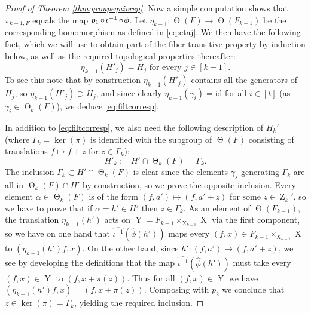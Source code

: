 \documentclass[a4paper,12pt,reqno]{amsart}
\theoremstyle{definition}
\def\to{\rightarrow}
\newcommand{\id}{\mathrm{id}}
\DeclareMathOperator{\ab}{Z}
\DeclareMathOperator{\tran}{\Theta}
\DeclareMathOperator{\ns}{X}
\DeclareMathOperator{\nss}{Y}
\DeclareMathOperator{\co}{\circ\hspace{-0.02 cm}}
\begin{document}
\begin{proof}[Proof of Theorem \ref{thm:groupequivrep}]
Now a simple computation shows that $\pi_{k-1,F}$ equals the map $p_1\co \iota^{-1}\co \phi$. Let $\eta_{k-1}:\tran(F)\to \tran(F_{k-1})$ be the corresponding homomorphism as defined in \eqref{eq:etaj}. We then have the following fact, which we will use to obtain part of the fiber-transitive property by induction below, as well as the required topological properties thereafter:
\begin{equation}\label{eq:filtcorresp}
\textrm{$\eta_{k-1}(H'_j)=H_j$ for every $j\in [k-1]$.}
\end{equation}
 To see this note that by construction $\eta_{k-1}(H'_j)$ contains all the generators of $H_j$, so $\eta_{k-1}(H'_j)\supset H_j$, and since clearly $\eta_{k-1}(\gamma_i)=\id$ for all $i\in[t]$ (as $\gamma_i\in\tran_k(F)$), we deduce \eqref{eq:filtcorresp}. 

In addition to \eqref{eq:filtcorresp}, we also need the following description of $H_k'$ (where 
$\Gamma_k=\ker(\pi)$ is identified with the subgroup of $\tran(F)$ consisting of translations $f\mapsto f+z$ for $z\in \Gamma_k$):
\begin{equation}\label{eq:filtcorresp-2}
H'_k:=H'\cap \tran_k(F) = \Gamma_k.
\end{equation}
The inclusion $\Gamma_k\subset H'\cap \tran_k(F)$ is clear since the elements $\gamma_s$ generating $\Gamma_k$ are all in $\tran_k(F)\cap H'$ by construction, so we prove the opposite inclusion. Every element $\alpha\in \tran_k(F)$ is of the form $(f,a')\mapsto(f,a'+z)$ for some $z\in \ab_k'$, so we have to prove that if $\alpha=h'\in H'$ then $z\in \Gamma_k$. As an element of $\tran(F_{k-1})$, the translation $\eta_{k-1}(h')$ acts on $\nss=F_{k-1}\times_{\ns_{k-1}}\ns$ via the first component, so we have on one hand that $\widehat{\iota^{-1}}(\widehat{\phi}(h'))$  maps every $(f,x)\in  F_{k-1}\times_{\ns_{k-1}}\ns$ to $(\eta_{k-1}(h')f,x)$. On the other hand, since $h':(f,a')\mapsto (f,a'+z)$, we see by developing the definitions that the map $\widehat{\iota^{-1}}(\widehat{\phi}(h'))$ must take every $(f,x)\in \nss$ to $(f,x+\pi(z))$. Thus for all $(f,x)\in \nss$ we have $(\eta_{k-1}(h')f,x)=(f,x+\pi(z))$. Composing with $p_2$ we conclude that $z\in \ker(\pi)= \Gamma_k$, yielding the required inclusion.


\end{proof}
\end{document}
